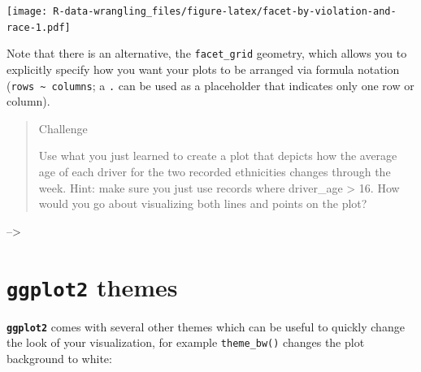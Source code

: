 \documentclass[]{book}
\newenvironment{Shaded}{\begin{snugshade}}{\end{snugshade}}
\newcommand{\KeywordTok}[1]{\textcolor[rgb]{0.13,0.29,0.53}{\textbf{#1}}}
\newcommand{\DataTypeTok}[1]{\textcolor[rgb]{0.13,0.29,0.53}{#1}}
\newcommand{\StringTok}[1]{\textcolor[rgb]{0.31,0.60,0.02}{#1}}
\newcommand{\OtherTok}[1]{\textcolor[rgb]{0.56,0.35,0.01}{#1}}
\newcommand{\OperatorTok}[1]{\textcolor[rgb]{0.81,0.36,0.00}{\textbf{#1}}}
\newcommand{\NormalTok}[1]{#1}
\theoremstyle{definition}
\theoremstyle{definition}
\theoremstyle{definition}
\theoremstyle{remark}
\begin{document}
\texttt{[image: R-data-wrangling\_files/figure-latex/facet-by-violation-and-race-1.pdf]}

Note that there is an alternative, the \texttt{facet\_grid} geometry,
which allows you to explicitly specify how you want your plots to be
arranged via formula notation
(\texttt{rows\ \textasciitilde{}\ columns}; a \texttt{.} can be used as
a placeholder that indicates only one row or column).

\begin{quote}
Challenge

Use what you just learned to create a plot that depicts how the average
age of each driver for the two recorded ethnicities changes through the
week. Hint: make sure you just use records where driver\_age
\textgreater{} 16. How would you go about visualizing both lines and
points on the plot?
\end{quote}

--\textgreater{}

\section{\texorpdfstring{\textbf{\texttt{ggplot2}}
themes}{ggplot2 themes}}\label{ggplot2-themes}

\textbf{\texttt{ggplot2}} comes with several other themes which can be
useful to quickly change the look of your visualization, for example
\texttt{theme\_bw()} changes the plot background to white:

\begin{Shaded}
\end{Shaded}
\end{document}
